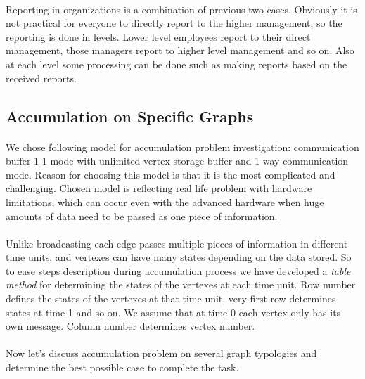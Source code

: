 \documentclass[a4paper,TexShade]{class}
\begin{document}
\paragraph{} Reporting in organizations is a combination of previous two cases. Obviously it is not practical for everyone to directly report to the higher management, so the reporting is done in levels. Lower level employees report to their direct management, those managers report to higher level management and so on. Also at each level some processing can be done such as making reports based on the received reports.


\subsection{Accumulation on Specific Graphs} \label{accumulation}
\paragraph{} We chose following model for accumulation problem investigation: communication buffer 1-1 mode with unlimited vertex storage buffer and 1-way communication mode. Reason for choosing this model is that it is the most complicated and challenging. Chosen model is reflecting real life problem with hardware limitations, which can occur even with the advanced hardware when huge amounts of data need to be passed as one piece of information. 

\paragraph{} Unlike broadcasting each edge passes multiple pieces of information in different time units, and vertexes can have many states depending on the data stored. So to ease steps description during accumulation process we have developed a \textit{table method} for determining the states of the vertexes at each time unit. Row number defines the states of the vertexes at that time unit, very first row determines states at time 1 and so on. We assume that at time 0 each vertex only has its own message. Column number determines vertex number.

\paragraph{} Now let's discuss accumulation problem on several graph typologies and determine the best possible case to complete the task.

\newpage
\end{document}
